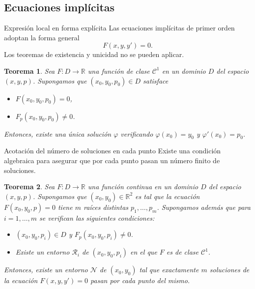 \documentclass[10pt, spanish]{beamer}
\newtheorem{teorema}{Teorema}
\begin{document}
\subsection{Ecuaciones implícitas}

\begin{frame}{Expresión local en forma explícita}
  Las ecuaciones implícitas de primer orden adoptan la forma general
  \[
  F(x,y,y')=0.
  \]
  Los teoremas de existencia y unicidad no se pueden aplicar.
  \begin{teorema}
    Sea $F:D \to \mathbb{R}$ una función de clase $\mathcal C^1$ en un dominio $D$ del espacio $(x,y,p)$. Supongamos que $(x_0,y_0,p_0)\in D$ satisface
    \begin{itemize}
      \item $F(x_0,y_0,p_0)=0$,
      \item $F_p(x_0,y_0,p_0)\neq 0$.
    \end{itemize}
    Entonces, existe una única solución $\varphi$ verificando $\varphi(x_0)=y_0$ y $\varphi'(x_0)=p_0$.
  \end{teorema}
\end{frame}

\begin{frame}{Acotación del número de soluciones en cada punto}
  Existe una condición algebraica para asegurar que por cada punto pasan un número finito de soluciones.

  \begin{teorema}
    Sea $F:D\to \mathbb{R}$ una función continua en un dominio $D$ del espacio $(x,y,p)$. Supongamos que $(x_0,y_0)\in \mathbb{R}^2$ es tal que la ecuación $F(x_0, y_0,p)=0$ tiene $m$ raíces distintas $p_1,\dots,p_m$. Supongamos además que para $i=1,\dots, m$ se verifican las siguientes condiciones:
    \vspace{-1.5em}
    \begin{itemize}
      \item $(x_0,y_0,p_i)\in D$ y $F_p(x_0,y_0,p_i)\neq 0$.
      \item Existe un entorno $\mathcal R_i$ de $(x_0,y_0,p_i)$ en el que $F$ es de clase $\mathcal C^1$.
    \end{itemize}
    Entonces, existe un entorno $\mathcal N$ de $(x_0,y_0)$ tal que exactamente $m$ soluciones de la ecuación $F(x,y,y')=0$ pasan por cada punto del mismo.
  \end{teorema}
\end{frame}
\end{document}
